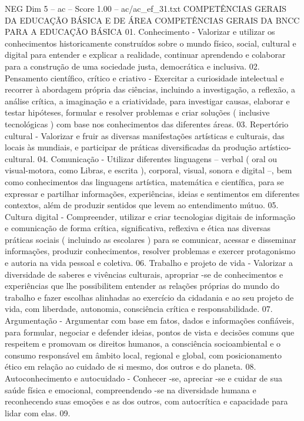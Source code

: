 \begin{textsample}{NEG Dim 5 – ac – Score 1.00 – ac/ac\_ef\_31.txt}
COMPETÊNCIAS GERAIS DA EDUCAÇÃO BÁSICA E DE ÁREA COMPETÊNCIAS GERAIS DA BNCC PARA A EDUCAÇÃO BÁSICA 01.
Conhecimento - Valorizar e utilizar os conhecimentos historicamente construídos sobre o mundo físico, social, cultural e digital para entender e explicar a realidade, continuar aprendendo e colaborar para a construção de uma sociedade justa, democrática e inclusiva. 02.
Pensamento científico, crítico e criativo - Exercitar a curiosidade intelectual e recorrer à abordagem própria das ciências, incluindo a investigação, a reflexão, a análise crítica, a imaginação e a criatividade, para investigar causas, elaborar e testar hipóteses, formular e resolver problemas e criar soluções ( inclusive tecnológicas ) com base nos conhecimentos das diferentes áreas. 03.
Repertório cultural - Valorizar e fruir as diversas manifestações artísticas e culturais, das locais às mundiais, e participar de práticas diversificadas da produção artístico-cultural. 04.
Comunicação - Utilizar diferentes linguagens – verbal ( oral ou visual-motora, como Libras, e escrita ), corporal, visual, sonora e digital –, bem como conhecimentos das linguagens artística, matemática e científica, para se expressar e partilhar informações, experiências, ideias e sentimentos em diferentes contextos, além de produzir sentidos que levem ao entendimento mútuo. 05.
Cultura digital - Compreender, utilizar e criar tecnologias digitais de informação e comunicação de forma crítica, significativa, reflexiva e ética nas diversas práticas sociais ( incluindo as escolares ) para se comunicar, acessar e disseminar informações, produzir conhecimentos, resolver problemas e exercer protagonismo e autoria na vida pessoal e coletiva. 06.
Trabalho e projeto de vida - Valorizar a diversidade de saberes e vivências culturais, apropriar -se de conhecimentos e experiências que lhe possibilitem entender as relações próprias do mundo do trabalho e fazer escolhas alinhadas ao exercício da cidadania e ao seu projeto de vida, com liberdade, autonomia, consciência crítica e responsabilidade. 07.
Argumentação - Argumentar com base em fatos, dados e informações confiáveis, para formular, negociar e defender ideias, pontos de vista e decisões comuns que respeitem e promovam os direitos humanos, a consciência socioambiental e o consumo responsável em âmbito local, regional e global, com posicionamento ético em relação ao cuidado de si mesmo, dos outros e do planeta. 08.
Autoconhecimento e autocuidado - Conhecer -se, apreciar -se e cuidar de sua saúde física e emocional, compreendendo -se na diversidade humana e reconhecendo suas emoções e as dos outros, com autocrítica e capacidade para lidar com elas. 09.

\end{textsample}
